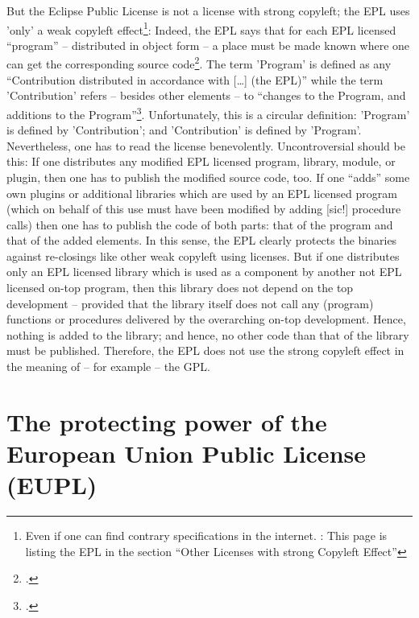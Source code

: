 But the Eclipse Public License is not a license with strong copyleft; the EPL
uses 'only' a weak copyleft effect\footnote{Even if one can find contrary
specifications in the internet. \cite[Pars pro toto cf.][\nopage wp
]{ifross2011a}: This page is listing the EPL in the section \enquote{Other
Licenses with strong Copyleft Effect}}: Indeed, the EPL says that for each EPL
licensed \enquote{program} -- distributed in object form -- a place must be made
known where one can get the corresponding source code\footcite[cf.][\nopage wp. 
§3, esp. §3.b.iv]{Epl10OsiLicense2005a}. The term 'Program' is defined as any
\enquote{Contribution distributed in accordance with [\ldots] (the EPL)} while
the term 'Contribution' refers -- besides other elements -- to \enquote{changes to
the Program, and additions to the Program}\footcite[cf.][\nopage wp. 
§1]{Epl10OsiLicense2005a}. Unfortunately, this is a circular definition:
'Program' is defined by 'Contribution'; and 'Contribution' is defined by
'Program'. Nevertheless, one has to read the license benevolently.
Uncontroversial should be this: If one distributes any modified EPL licensed
program, library, module, or plugin, then one has to publish the modified source
code, too. If one \enquote{adds} some own plugins or additional libraries which
are used by an EPL licensed program (which on behalf of this use must have been
modified by adding [sic!] procedure calls) then one has to publish the code of
both parts: that of the program and that of the added elements. In this sense,
the EPL clearly protects the binaries against re-closings like other weak
copyleft using licenses. But if one distributes only an EPL licensed library
which is used as a component by another not EPL licensed on-top program, then
this library does not depend on the top development -- provided that the library
itself does not call any (program) functions or procedures delivered by the
overarching on-top development. Hence, nothing is added to the library; and
hence, no other code than that of the library must be published. Therefore, the
EPL does not use the strong copyleft effect in the meaning of -- for example --
the GPL.
 
\section{The protecting power of the European Union Public License (EUPL)}
\label{sec:ProtectingPowerOfEupl}

